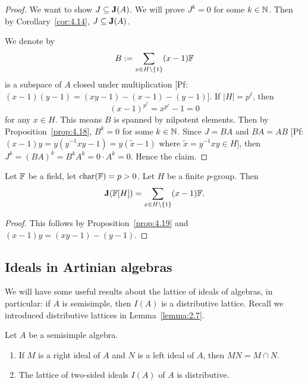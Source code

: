 \begin{proof}
We want to show $J\subseteq\operatorname{\textup{\textbf{J}}}(A)$. We will prove $J^{k}=0$ for
some $k\in\mathbb{N}$. Then by Corollary~\ref{cor:4.14}, $J\subseteq\operatorname{\textup{\textbf{J}}}(A)$.

We denote by
\begin{equation}
B:=\sum_{x\in H\setminus\{1\}}(x-1)\mathbb{F}
\end{equation}
is a subspace of $A$ closed under multiplication [Pf: $(x-1)(y-1)=(xy-1)-(x-1)-(y-1)$].
If $|H|=p^{\ell}$, then
\begin{equation}
(x-1)^{p^{\ell}}=x^{p^{\ell}}-1=0
\end{equation}
for any $x\in H$. This means $B$ is spanned by nilpotent
elements. Then by Proposition~\ref{prop:4.18}, $B^{k}=0$ for some $k\in\mathbb{N}$.
Since $J=BA$ and $BA=AB$ [Pf:
  $(x-1)y=y(y^{-1}xy-1)=y(\widetilde{x}-1)$ where
  $\widetilde{x}=y^{-1}xy\in H$],
then $J^{k}=(BA)^{k}=B^{k}A^{k}=0\cdot A^{k}=0$. Hence the claim.
\end{proof}

\begin{corollary}\label{cor:4.20}
Let $\mathbb{F}$ be a field, let $\operatorname{char}(\mathbb{F})=p>0$. Let $H$ be a finite
$p$-group. Then
\begin{equation*}
\operatorname{\textup{\textbf{J}}}(\mathbb{F}[H])=\sum_{x\in H\setminus\{1\}}(x-1)\mathbb{F}.
\end{equation*}
\end{corollary}

\begin{proof}
This follows by Proposition~\ref{prop:4.19} and $(x-1)y=(xy-1)-(y-1)$.
\end{proof}

\subsection{Ideals in Artinian algebras}

We will have some useful results about the lattice of ideals of
algebras, in particular: if $A$ is semisimple, then $I(A)$ is a
distributive lattice. Recall we introduced distributive lattices in Lemma~\ref{lemma:2.7}.

\begin{lemma}\label{lemma:4.21}
Let $A$ be a semisimple algebra.
\begin{enumerate}
\item If $M$ is a right ideal of $A$ and $N$ is a left ideal of $A$,
  then $MN=M\cap N$.
\item The lattice of two-sided ideals $I(A)$ of $A$ is distributive.
\end{enumerate}
\end{lemma}

